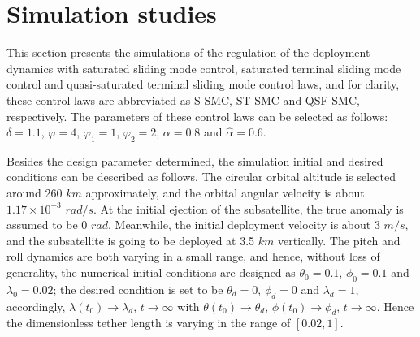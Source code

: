 \documentclass[3p]{elsarticle}
\theoremstyle{plain}
\theoremstyle{remark}
\begin{document}
\section{Simulation studies}\label{sec:4}
This section presents the simulations of the regulation of the deployment dynamics with saturated sliding mode control, saturated terminal sliding mode control and quasi-saturated terminal sliding mode control laws, and for clarity, these control laws are abbreviated as S-SMC, ST-SMC and QSF-SMC, respectively. The parameters of these control laws can be selected as follows: $\delta=1.1$, $\varphi= 4$, $\varphi_1 = 1$, $\varphi_2= 2$, $\alpha = 0.8$ and $\hat\alpha=0.6$.\par
Besides the design parameter determined, the simulation initial and desired conditions can be described as follows. The circular orbital altitude is selected around 260 $km$ approximately, and the orbital angular velocity is about $1.17\times 10^{-3}$ $rad/s$. At the initial ejection of the subsatellite, the true anomaly is assumed to be 0 $rad$. Meanwhile, the initial deployment velocity is about 3 $m/s$, and the subsatellite is going to be deployed at 3.5 $km$ vertically. The pitch and roll dynamics are both varying in a small range, and hence, without loss of generality, the numerical initial conditions are designed as $\theta_0 = 0.1$, $\phi_0 = 0.1$ and $\lambda_0 = 0.02$; the desired condition is set to be $\theta_d = 0$, $\phi_d = 0$ and $\lambda_d = 1$, accordingly, $\lambda(t_0)\rightarrow\lambda_d$, $t\rightarrow\infty$ with $\theta(t_0)\rightarrow\theta_d$, $\phi(t_0)\rightarrow\phi_d$, $t\rightarrow\infty$. Hence the dimensionless tether length is varying in the range of $[0.02,1]$.
\end{document}
